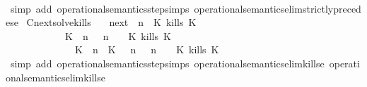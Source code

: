 \begin{isabellebody}
%
\isadelimproof
\ \ %
\endisadelimproof
%
\isatagproof
{}\isamarkupfalse%
\ {\isacharparenleft}simp\ add{\isacharcolon}\ operational{\isacharunderscore}semantics{\isacharunderscore}step{\isachardot}simps\ operational{\isacharunderscore}semantics{\isacharunderscore}elim{\isachardot}strictly{\isacharunderscore}precedes{\isacharunderscore}e{\isacharparenright}%
\endisatagproof
{\isafoldproof}%
%
\isadelimproof
\isanewline
%
\endisadelimproof
\isanewline
{}\isamarkupfalse%
\ Cnext{\isacharunderscore}solve{\isacharunderscore}kills{\isacharcolon}\isanewline
\ \ \ {\isachardoublequoteopen}{\isacharparenleft}{\isasymC}\isactrlsub n\isactrlsub e\isactrlsub x\isactrlsub t\ {\isacharparenleft}{\isasymGamma}{\isacharcomma}\ n\ {\isasymturnstile}\ {\isacharparenleft}{\isacharparenleft}K\ kills\ K\ {\isacharhash}\ {\isasymPsi}{\isacharparenright}\ {\isasymtriangleright}\ {\isasymPhi}{\isacharparenright}{\isacharparenright}\isanewline
\ \ \ \ \ \ \ \ \ \ {\isasymsupseteq}\ {\isacharbraceleft}\ {\isacharparenleft}{\isacharparenleft}K\ {\isasymnot}{\isasymUp}\ n{\isacharparenright}\ {\isacharhash}\ {\isasymGamma}{\isacharparenright}{\isacharcomma}\ n\ {\isasymturnstile}\ {\isasymPsi}\ {\isasymtriangleright}\ {\isacharparenleft}{\isacharparenleft}K\ kills\ K\ {\isacharhash}\ {\isasymPhi}{\isacharparenright}{\isacharcomma}\isanewline
\ \ \ \ \ \ \ \ \ \ \ \ \ \ {\isacharparenleft}{\isacharparenleft}K\ {\isasymUp}\ n{\isacharparenright}\ {\isacharhash}\ {\isacharparenleft}K\ {\isasymnot}{\isasymUp}\ {\isasymge}\ n{\isacharparenright}\ {\isacharhash}\ {\isasymGamma}{\isacharparenright}{\isacharcomma}\ n\ {\isasymturnstile}\ {\isasymPsi}\ {\isasymtriangleright}\ {\isacharparenleft}{\isacharparenleft}K\ kills\ K\ {\isacharhash}\ {\isasymPhi}{\isacharparenright}{\isacharbraceright}{\isachardoublequoteclose}\isanewline
%
\isadelimproof
\ \ %
\endisadelimproof
%
\isatagproof
{}\isamarkupfalse%
\ {\isacharparenleft}simp\ add{\isacharcolon}\ operational{\isacharunderscore}semantics{\isacharunderscore}step{\isachardot}simps\ operational{\isacharunderscore}semantics{\isacharunderscore}elim{\isachardot}kills{\isacharunderscore}e{}\ operational{\isacharunderscore}semantics{\isacharunderscore}elim{\isachardot}kills{\isacharunderscore}e{}{\isacharparenright}%

\end{isabellebody}
